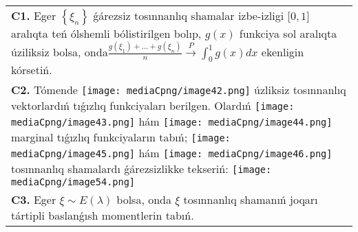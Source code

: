 \documentclass{article}
\begin{document}
\begin{tabular}{m{17cm}}
 \\
\textbf{C1.} Eger \(\left\{ \xi_{n} \right\}\) ǵárezsiz tosınnanlıq shamalar izbe-izligi \(\lbrack 0,1\rbrack\) aralıqta teń ólshemli bólistirilgen bolıp, \(g(x)\) funkciya sol aralıqta úziliksiz bolsa, onda\(\frac{g\left( \xi_{1} \right) + ... + g\left( \xi_{n} \right)}{n}\overset{P}{\rightarrow}\int_{0}^{1}{g(x)}dx\) ekenligin kórsetiń.
 \\
\textbf{C2.} Tómende \texttt{[image: mediaCpng/image42.png]} úzliksiz tosınnanlıq vektorlardıń tıǵızlıq funkciyaları berilgen. Olardıń \texttt{[image: mediaCpng/image43.png]} hám \texttt{[image: mediaCpng/image44.png]} marginal tıǵızlıq funkciyaların tabıń; \texttt{[image: mediaCpng/image45.png]} hám \texttt{[image: mediaCpng/image46.png]} tosınnanlıq shamalardı ǵárezsizlikke tekseriń: \texttt{[image: mediaCpng/image54.png]}
 \\
\textbf{C3.} Eger \(\xi\sim E(\lambda)\) bolsa, onda \(\xi\) tosınnanlıq shamanıń joqarı tártipli baslanǵısh momentlerin tabıń.
 \\

\end{tabular}
\vspace{1cm}
\end{document}
